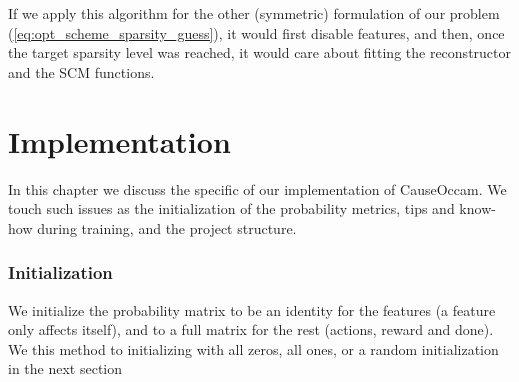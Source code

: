 \documentclass[a4paper,11pt,oneside]{report}
\newcommand{\sysname}{CauseOccam\xspace}
\begin{document}
If we apply this algorithm for the other (symmetric) formulation of our problem (\autoref{eq:opt_scheme_sparsity_guess}), it would first disable features, and then, once the target sparsity level was reached, it would care about fitting the reconstructor and the SCM functions.




\chapter{Implementation}
\label{ch:implementation}
In this chapter we discuss the specific of our implementation of \sysname. We touch such issues as the initialization of the probability metrics, tips and know-how during training, and the project structure.

\subsection{Initialization}
We initialize the probability matrix to be an identity for the features (a feature only affects itself), and to a full matrix for the rest (actions, reward and done). We this method to initializing with all zeros, all ones, or a random initialization in the next section
\end{document}
